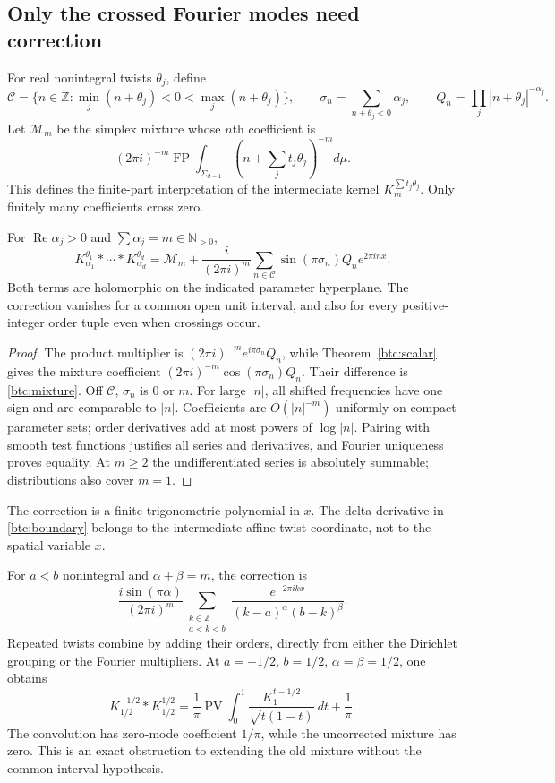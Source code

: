 \subsection{Only the crossed Fourier modes need correction}
For real nonintegral twists $\theta_j$, define
\[
 \mathcal C=\{n\in\mathbb Z:
       \min_j(n+\theta_j)<0<\max_j(n+\theta_j)\},\qquad
 \sigma_n=\sum_{n+\theta_j<0}\alpha_j,\qquad
 Q_n=\prod_j|n+\theta_j|^{-\alpha_j}.
\]
Let $\mathcal M_m$ be the simplex mixture whose $n$th coefficient is
\[
 (2\pi i)^{-m}\operatorname{FP}
          \int_{\Sigma_{d-1}}\left(n+\sum_jt_j\theta_j\right)^{-m}d\mu.
\]
This defines the finite-part interpretation of the intermediate kernel
$K_m^{\sum t_j\theta_j}$. Only finitely many coefficients cross zero.
\begin{theorem}
\label{btc:periodic}
For $\operatorname{Re}\alpha_j>0$ and $\sum\alpha_j=m\in\mathbb N_{>0}$,
\begin{equation}\label{btc:mixture}
 K_{\alpha_1}^{\theta_1}*\cdots*K_{\alpha_d}^{\theta_d}
 =\mathcal M_m+\frac{i}{(2\pi i)^m}
      \sum_{n\in\mathcal C}\sin(\pi\sigma_n)Q_ne^{2\pi i n x}.
\end{equation}
Both terms are holomorphic on the indicated parameter hyperplane.
The correction vanishes for a common open unit interval, and also for
every positive-integer order tuple even when crossings occur.
\end{theorem}
\begin{proof}
The product multiplier is $(2\pi i)^{-m}e^{i\pi\sigma_n}Q_n$,
while Theorem~\ref{btc:scalar} gives the mixture coefficient
$(2\pi i)^{-m}\cos(\pi\sigma_n)Q_n$. Their difference is
\eqref{btc:mixture}. Off $\mathcal C$, $\sigma_n$ is $0$ or $m$.
For large $|n|$, all shifted frequencies have one sign and are comparable
to $|n|$. Coefficients are $O(|n|^{-m})$ uniformly on compact parameter
sets; order derivatives add at most powers of $\log|n|$.
Pairing with smooth test functions justifies all series and derivatives,
and Fourier uniqueness proves equality. At $m\ge2$ the undifferentiated
series is absolutely summable; distributions also cover $m=1$.
\end{proof}
The correction is a finite trigonometric polynomial in $x$. The delta
derivative in \eqref{btc:boundary} belongs to the intermediate affine
twist coordinate, not to the spatial variable $x$.

For $a<b$ nonintegral and $\alpha+\beta=m$, the correction is
\[
 \frac{i\sin(\pi\alpha)}{(2\pi i)^m}
 \sum_{\substack{k\in\mathbb Z\\a<k<b}}
       \frac{e^{-2\pi i kx}}{(k-a)^\alpha(b-k)^\beta}.
\]
Repeated twists combine by adding their orders, directly from either the
Dirichlet grouping or the Fourier multipliers.
At $a=-1/2$, $b=1/2$, $\alpha=\beta=1/2$, one obtains
\begin{equation}\label{btc:counterexample}
 K_{1/2}^{-1/2}*K_{1/2}^{1/2}
 =\frac1\pi\operatorname{PV}\int_0^1
          \frac{K_1^{t-1/2}}{\sqrt{t(1-t)}}\,dt+\frac1\pi.
\end{equation}
The convolution has zero-mode coefficient $1/\pi$, while the uncorrected
mixture has zero. This is an exact obstruction to extending the old
mixture without the common-interval hypothesis.


